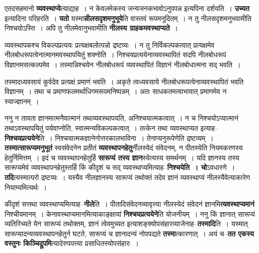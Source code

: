 \documentclass[article,12pt,a4paper]{memoir}
\begin{document}
	  \pstart एतदसहमानो \textbf{व्यवस्थाप्ये}त्याद्याह । न केवलमेकस्य जन्यजनकभावोऽनुपपन्न इत्यपिना दर्शयति । \textbf{उच्यत} इत्यादिना परिहरति । \textbf{यतो} यस्मा\textbf{न्नीलसदृशमनुभूये}ति वास्तवं रूपमनूदितम् । न तु नीलसदृशमनुभवामीति निश्चयोऽस्ति । अपि तु नीलमेवानुभवामीति \textbf{नीलस्य ग्राहकमवस्थाप्यते} ।
	\pend
	  \bigskip
	  \begingroup
	

	  \pstart व्यवस्थापकश्च विकल्पप्रत्ययः प्रत्यक्षबलोत्पन्नो द्रष्टव्यः । न तु निर्विकल्पकत्वात् प्रत्यक्षमेव नीलबोधरूपत्वेनात्मानमवस्थापयितुं शक्नोति । निश्चयप्रत्ययेनाव्यवस्थापितं सदपि नीलबोधरूपं विज्ञानमसत्कल्पमेव । तस्मान्निश्चयेन नीलबोधरूपं व्यवस्थापितं विज्ञानं नीलबोधात्मना सद् भवति ।
	\pend
        

	  \pstart तस्मादध्यवसायं कुर्वदेव प्रत्यक्षं प्रमाणं भवति । अकृते त्वध्यवसाये नीलबोधरूपत्वेनाव्यवस्थापितं भवति विज्ञानम् । तथा च प्रमाणफलमर्थाधिगमरूपमनिष्पन्नम् । अतः साधकतमत्वाभावात् प्रमाणमेव न स्याज्ज्ञानम् ।
	\pend
      
	  \endgroup
	

	  \pstart ननु न तावता ज्ञानमात्मनैवात्मानं तथा\leavevmode{}व्यवस्थापयति, अनिश्चयात्मकत्वात् । न च निश्चयोऽप्यात्मानं तथाऽवस्थापयितुं पर्यवाप्नोति, स्वात्मन्यविकल्पकत्वात् । तत्केन तथा व्यवस्थाप्यत इत्याह--\textbf{निश्चयप्रत्ययेने}ति । निश्चयात्मकज्ञानेनोत्तरकालभाविना । तेनाप्यनुरूपेणेति द्रष्टव्यम् । \textbf{तस्मात्सारूप्यमनुभूतं} स्वसंवेदनेन प्रतीतं \textbf{व्यवस्थापनहेतु}र्नीलस्येदं संवेदनम्, न पीतस्येति नियमकरणस्य हेतुर्निमित्तम् । इदं च व्यवस्थापनहेतुर्हि \textbf{सारूप्यं तस्य ज्ञान}स्येत्यस्य समर्थनम् । यदि ज्ञानस्य तस्य सारूप्यमेवं व्यवस्थापनहेतुस्तर्हि किं कीदृशं च सद् व्यवस्थाप्यमित्याह--\textbf{निश्चयेति । चो}ऽवधारणे । \textbf{तदि}त्यस्मात्परो द्रष्टव्यः । यस्यैव नीलज्ञानस्य सारूप्यं तथोक्तं तदेव ज्ञानं व्यवस्थाप्यं नीलस्यैवेत्याकारेण नियाम्यमित्यर्थः ।
	\pend
      

	  \pstart कीदृशं सत्तथा व्यवस्थाप्यमित्याह--\textbf{नीले}ति । पीतादिसंवेदनव्यावृत्त्या नीलस्येदं संवेदनं ज्ञानमि\textbf{त्यवस्थाप्यमानं} निश्चीयमानम् । केनावस्थाप्यमानमित्याकाङ्क्षायां \textbf{निश्चयप्रत्ययेने}ति योजनीयम् । ननु किं ज्ञानात् सारूप्यं व्यतिरिच्यते येन सारूप्यं तथोक्तम्, ज्ञानं त्वेवमुच्यत इत्याशङ्क्योपसंहारव्याजेनाह--\textbf{तस्मादि}ति । यस्मात् सारूप्यादन्यव्यवस्थापनहेतुर्न घटते, सारूप्यं च ज्ञानादन्यं नोपपद्यते \textbf{तस्मा}त्कारणात् । अयं च--\textbf{तत एकस्य वस्तुनः किञ्चिद्रूपमि}त्यादेरुपपत्त्या प्रसाधितस्योपसंहारः ।
	\pend
      
\end{document}
